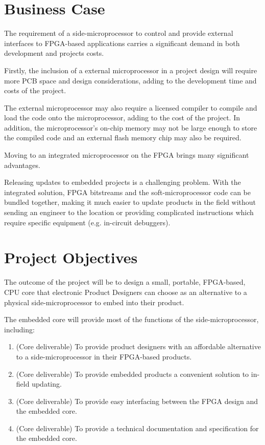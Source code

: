 \documentclass[11pt,a4paper]{article}
\begin{document}
\section{Business Case}
The requirement of a side-microprocessor to control and provide external interfaces to FPGA-based applications carries a significant demand in both development and projects costs. 

Firstly, the inclusion of a external microprocessor in a project design will require more PCB space and design considerations, adding to the development time and costs of the project. 

The external microprocessor may also require a licensed compiler to compile and load the code onto the microprocessor, adding to the cost of the project. In addition, the  microprocessor's on-chip memory may not be large enough to store the compiled code and an external flash memory chip may also be required.

Moving to an integrated microprocessor on the FPGA brings many significant advantages.

Releasing updates to embedded projects is a challenging problem. With the integrated solution, FPGA bitstreams and the soft-microprocessor code can be bundled together, making it much easier to update products in the field without sending an engineer to the location or providing complicated instructions which require specific equipment (e.g. in-circuit debuggers).


\section{Project Objectives}
The outcome of the project will be to design a small, portable, FPGA-based, CPU core that electronic Product Designers can choose as an alternative to a physical side-microprocessor to embed into their product.

The embedded core will provide most of the functions of the side-microprocessor, including:
\begin{enumerate}
\item{(Core deliverable) To provide product designers with an affordable alternative to a side-microprocessor in their FPGA-based products.}
\item{(Core deliverable) To provide embedded products a convenient solution to in-field updating.}
\item{(Core deliverable) To provide easy interfacing between the FPGA design and the embedded core.} 
\item{(Core deliverable) To provide a technical documentation and specification for the embedded core.} 
\end{enumerate}
\end{document}
